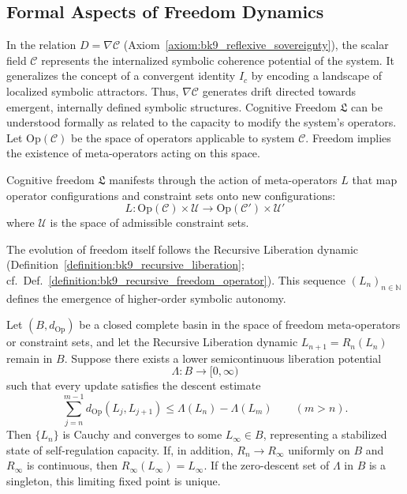 \subsection*{Formal Aspects of Freedom Dynamics}
\label{subsec:bk9_formal_aspects_of_freedom_dynamics}
In the relation $D = \nabla \mathcal{C}$ (Axiom~\ref{axiom:bk9_reflexive_sovereignty}), the scalar field $\mathcal{C}$ represents the internalized symbolic coherence potential of the system. It generalizes the concept of a convergent identity $I_c$ by encoding a landscape of localized symbolic attractors. Thus, $\nabla \mathcal{C}$ generates drift directed towards emergent, internally defined symbolic structures.
Cognitive Freedom $\mathfrak{L}$ can be understood formally as related to the capacity to modify the system's operators. Let $\text{Op}(\mathcal{C})$ be the space of operators applicable to system $\mathcal{C}$. Freedom implies the existence of meta-operators acting on this space.
\begin{definition}\label{definition:bk9_meta_operator_action}
Cognitive freedom $\mathfrak{L}$ manifests through the action of meta-operators $L$ that map operator configurations and constraint sets onto new configurations:
\[
L: \text{Op}(\mathcal{C}) \times \mathcal{U} \to \text{Op}(\mathcal{C}') \times \mathcal{U}'
\]
where $\mathcal{U}$ is the space of admissible constraint sets.
\end{definition}
The evolution of freedom itself follows the Recursive Liberation dynamic (Definition~\ref{definition:bk9_recursive_liberation}; cf.~Def.~\ref{definition:bk9_recursive_freedom_operator}). This sequence $(L_n)_{n \in \mathbb{N}}$ defines the emergence of higher-order symbolic autonomy.
\begin{proposition}
\label{proposition:bk9_convergence_of_recursive_liberation}
Let $(B,d_{\mathrm{Op}})$ be a closed complete basin in the space of freedom
meta-operators or constraint sets, and let the Recursive Liberation dynamic
$L_{n+1}=R_n(L_n)$ remain in $B$. Suppose there exists a lower semicontinuous
liberation potential
\[
\Lambda:B\to[0,\infty)
\]
such that every update satisfies the descent estimate
\[
\sum_{j=n}^{m-1} d_{\mathrm{Op}}(L_j,L_{j+1})
\leq \Lambda(L_n)-\Lambda(L_m)
\qquad (m>n).
\]
Then $\{L_n\}$ is Cauchy and converges to some $L_\infty\in B$,
representing a stabilized state of self-regulation capacity. If, in addition,
$R_n\to R_\infty$ uniformly on $B$ and $R_\infty$ is continuous, then
$R_\infty(L_\infty)=L_\infty$. If the zero-descent set of $\Lambda$ in $B$ is a
singleton, this limiting fixed point is unique.
\end{proposition}

